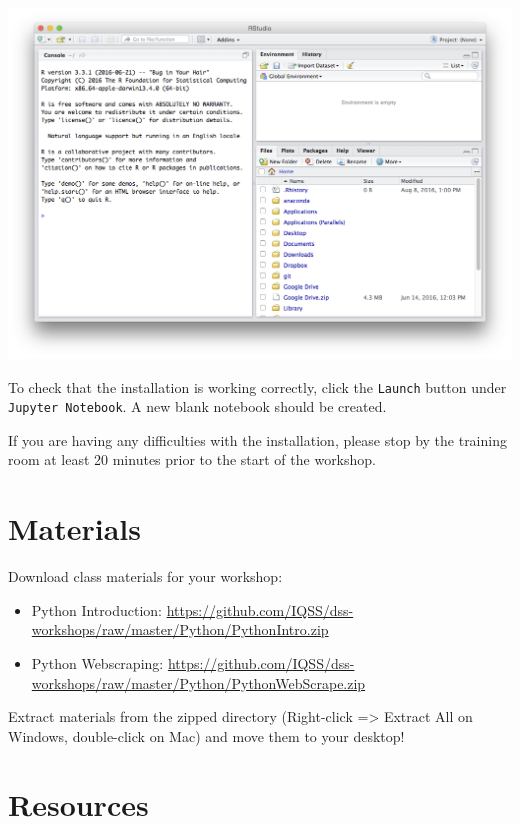 \documentclass[]{book}
\providecommand{\tightlist}{%
  \setlength{\itemsep}{0pt}\setlength{\parskip}{0pt}}
\begin{document}
\includegraphics{R/Rinstall/images/rstudio_successful_install.png}

To check that the installation is working correctly, click the \texttt{Launch} button under \texttt{Jupyter\ Notebook}. A new blank notebook should be created.

If you are having any difficulties with the installation, please stop by the training room at least 20 minutes prior to the start of the workshop.

\hypertarget{materials-1}{%
\section{Materials}\label{materials-1}}

Download class materials for your workshop:

\begin{itemize}
\tightlist
\item
  Python Introduction: \url{https://github.com/IQSS/dss-workshops/raw/master/Python/PythonIntro.zip}
\item
  Python Webscraping: \url{https://github.com/IQSS/dss-workshops/raw/master/Python/PythonWebScrape.zip}
\end{itemize}

Extract materials from the zipped directory (Right-click =\textgreater{} Extract All on Windows, double-click on Mac) and move them to your desktop!

\hypertarget{resources-6}{%
\section{Resources}\label{resources-6}}
\end{document}
